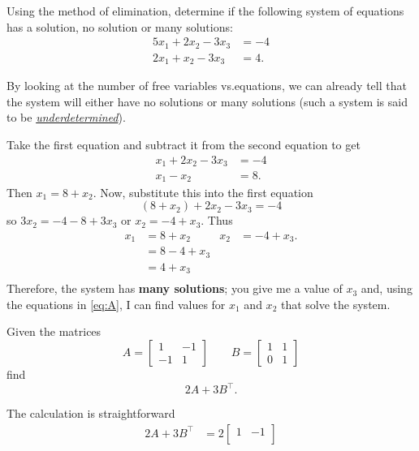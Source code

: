 \begin{questions}
  \question[10] Using the method of elimination, determine if the following
  system of equations has a solution, no solution or many solutions:
  \begin{align*}{5}
    x_1+2x_2-3x_3&=-4\\
    2x_1+x_2-3x_3&=4.
  \end{align*}
  \begin{solution}
    By looking at the number of free variables vs.\@ equations, we can
    already tell that the system will either have no solutions or many
    solutions (such a system is said to be
    \emph{\href{https://en.wikipedia.org/wiki/Underdetermined_system}{underdetermined}}).

    Take the first equation and subtract it from the second equation to get
    \begin{align*}
      x_1+2x_2-3x_3&=-4\\
      x_1-x_2&=8.
    \end{align*}
    Then $x_1=8+x_2$. Now, substitute this into the first equation
    \[
      (8+x_2)+2x_2-3x_3=-4
    \]
    so $3x_2=-4-8+3x_3$ or $x_2=-4+x_3$. Thus
    \[
      \label{eq:A}
      \tag{$\star$}
      \begin{aligned}
        x_1&=8+x_2&
        x_2&=-4+x_3.\\
        &=8-4+x_3\\
        &=4+x_3\\
      \end{aligned}
    \]
    Therefore, the system has \textbf{many solutions}; you give me a value
    of $x_3$ and, using the equations in \eqref{eq:A}, I can find values
    for $x_1$ and $x_2$ that solve the system.
  \end{solution}
  \question[5] Given the matrices
  \[
    A=
    \begin{bmatrix}
      1&-1\\
      -1&1
    \end{bmatrix}
    \qquad
    B=
    \begin{bmatrix}
      1&1\\
      0&1
    \end{bmatrix}
  \]
  find
  \[
    2A+3B^\intercal.
  \]
  \begin{solution}
    The calculation is straightforward
    \begin{align*}
      2A+3B^\intercal
      &=
        2\begin{bmatrix}
          1&-1\\

\end{bmatrix}
\end{align*}
\end{solution}
\end{questions}
